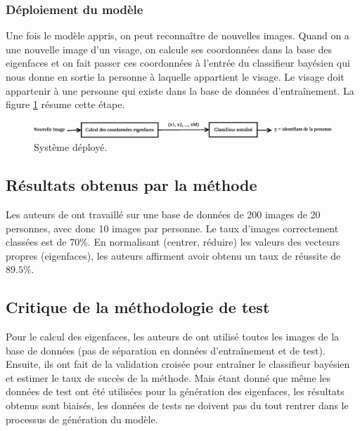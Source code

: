 \subsubsection{Déploiement du modèle}
Une fois le modèle appris, on peut reconnaître de nouvelles images. Quand on a une nouvelle
image d'un visage, on calcule ses coordonnées dans la base des eigenfaces et on fait
passer ces coordonnées à l'entrée du classifieur bayésien qui nous donne en sortie la
personne à laquelle appartient le visage. Le visage doit appartenir à une personne qui existe
dans la base de données d'entraînement. La figure \ref{fig:article:etapes_deploiement}
résume cette étape.
\begin{figure}[H]
    \centering
    \includegraphics[scale=0.4]{images/article_etapes_deploiement}
    \caption{Système déployé.}
    \label{fig:article:etapes_deploiement}
\end{figure}


\subsection{Résultats obtenus par la méthode}
Les auteurs de \cite{article} ont travaillé sur une base de données
de 200 images de 20 personnes, avec donc 10 images par personne.
Le taux d'images correctement classées est de $70\%$. En normalisant
(centrer, réduire) les valeurs des vecteurs propres (eigenfaces),
les auteurs affirment avoir obtenu un taux de réussite de $89.5\%$.


\subsection{Critique de la méthodologie de test}
Pour le calcul des eigenfaces, les auteurs de \cite{article} ont
utilisé toutes les images de la base de données (pas de séparation
en données d'entraînement et de test). Ensuite, ils ont fait de la
validation croisée pour entraîner le classifieur bayésien et estimer
le taux de succès de la méthode. Mais étant donné que même les 
données de test ont été utilisées pour la génération des eigenfaces,
les résultats obtenus sont biaisés, les données de tests ne doivent
pas du tout rentrer dans le processus de génération du modèle.